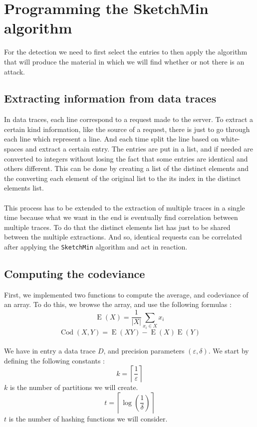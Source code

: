 \documentclass[a4paper]{article}%
\DeclareMathOperator{\E}{E}
\DeclareMathOperator{\Cod}{Cod}
\begin{document}
\section{Programming the SketchMin algorithm}
For the detection we need to first select the entries to then apply the algorithm that will produce the material in which we will find whether or not there is an attack.

\subsection{Extracting information from data traces}

In data traces, each line correspond to a request made to the server. To extract a certain kind information, like the source of a request, there is just to go through each line which represent a line. And each time split the line based on white-spaces and extract a certain entry. The entries are put in a list, and if needed are converted to integers without losing the fact that some entries are identical and others different. This can be done by creating a list of the distinct elements and the converting each element of the original list to the its index in the distinct elements list.

\paragraph{}This process has to be extended to the extraction of multiple traces in a single time because what we want in the end is eventually find correlation between multiple traces. To do that the distinct elements list has just to be shared between the multiple extractions. And so, identical requests can be correlated after applying the \texttt{SketchMin} algorithm and act in reaction.

\subsection{Computing the codeviance}
First, we implemented two functions to compute the average, and codeviance of an array. To do this, we browse the array, and use the following formulas :
	\[ \E(X) = \frac{1}{|X|} \sum\limits_{x_i \in X} x_i \]
	\[ \Cod(X,Y) = \E(XY) - \E(X)\E(Y) \]
	
\paragraph{}We have in entry a data trace $D$, and precision parameters $(\varepsilon, \delta)$. We start by defining the following constants :
	\[ k =\left\lceil \frac{1}{\varepsilon} \right\rceil \]
$k$ is the number of partitions we will create.
	\[ t = \left\lceil \log(\frac{1}{\delta}) \right\rceil \]
$t$ is the number of hashing functions we will consider.
	
\end{document}
